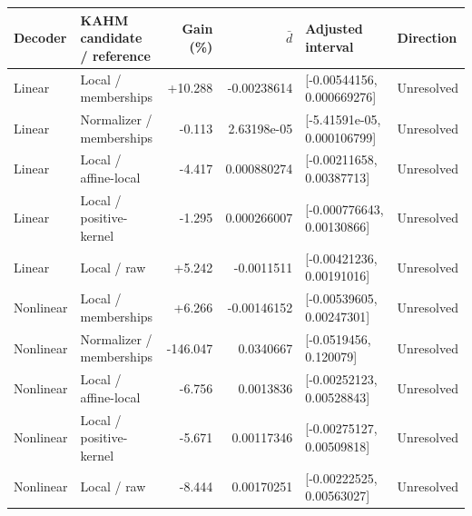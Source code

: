 \begin{tabular}{llrrll}
\toprule
Decoder & KAHM candidate / reference & Gain (\%) & $\bar d$ & Adjusted interval & Direction \\
\midrule
Linear & Local / memberships & +10.288 & -0.00238614 & [-0.00544156, 0.000669276] & Unresolved \\
Linear & Normalizer / memberships & -0.113 & 2.63198e-05 & [-5.41591e-05, 0.000106799] & Unresolved \\
Linear & Local / affine-local & -4.417 & 0.000880274 & [-0.00211658, 0.00387713] & Unresolved \\
Linear & Local / positive-kernel & -1.295 & 0.000266007 & [-0.000776643, 0.00130866] & Unresolved \\
Linear & Local / raw & +5.242 & -0.0011511 & [-0.00421236, 0.00191016] & Unresolved \\
\midrule
Nonlinear & Local / memberships & +6.266 & -0.00146152 & [-0.00539605, 0.00247301] & Unresolved \\
Nonlinear & Normalizer / memberships & -146.047 & 0.0340667 & [-0.0519456, 0.120079] & Unresolved \\
Nonlinear & Local / affine-local & -6.756 & 0.0013836 & [-0.00252123, 0.00528843] & Unresolved \\
Nonlinear & Local / positive-kernel & -5.671 & 0.00117346 & [-0.00275127, 0.00509818] & Unresolved \\
Nonlinear & Local / raw & -8.444 & 0.00170251 & [-0.00222525, 0.00563027] & Unresolved \\
\bottomrule
\end{tabular}
